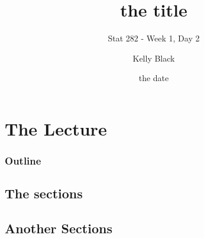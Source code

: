 
\section{The Lecture}

\title{the title}
\subtitle{Stat 282 - Week 1, Day 2}

\author{Kelly Black}
\date{the date}

\begin{frame}
  \titlepage
\end{frame}

\begin{frame}
  \frametitle{Outline}
  \tableofcontents[pausesection,hideothersubsections,sectionstyle=show/hide]
\end{frame}


\subsection{The sections}


\begin{frame}
  \frametitle{}


\end{frame}




\subsection{Another Sections}

\begin{frame}
  \frametitle{}



\end{frame}


\begin{frame}
  \frametitle{}

  \begin{definition}
    
  \end{definition}

\end{frame}


